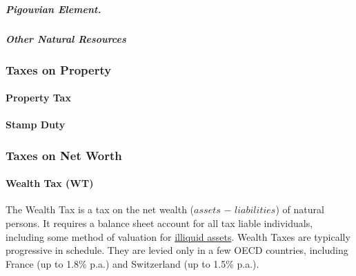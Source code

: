 \subparagraph{Pigouvian Element.} %

\subparagraph{Other Natural Resources}




\subsubsection{Taxes on Property}

\paragraph{Property Tax}
	\label{sec:PT}

\paragraph{Stamp Duty}
	\label{sec:SD}

\subsubsection{Taxes on Net Worth}

\paragraph{Wealth Tax (WT)}
	\label{sec:WT}
The Wealth Tax is a tax on the net wealth ($assets$ $-$ $liabilities$) of natural persons.
It requires a balance sheet account for all tax liable individuals, including some method of valuation for \hyperref[des:NoIlliquidAssets]{illiquid assets}.
Wealth Taxes are typically progressive in schedule.
They are levied only in a few OECD countries, including France (up to 1.8\% p.a.) and Switzerland (up to 1.5\% p.a.).

